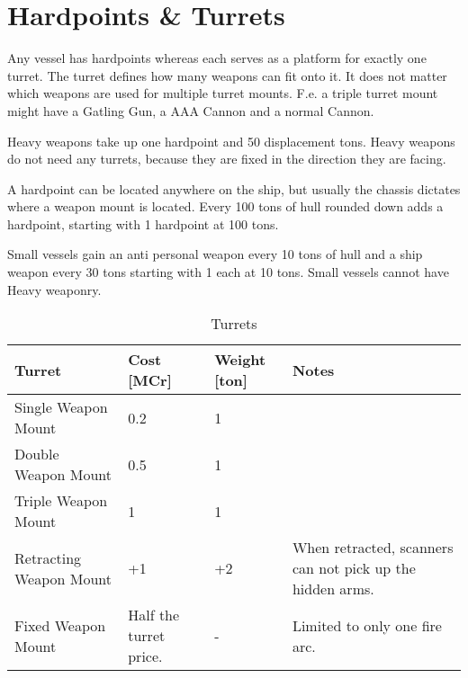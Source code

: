 \section{Hardpoints \& Turrets}
\label{sec:Hardpoints & Turrets}

Any vessel has hardpoints whereas each serves as a platform for exactly one turret. The turret defines how many weapons can fit onto it. It does not matter which weapons are used for multiple turret mounts. F.e. a triple turret mount might have a Gatling Gun, a AAA Cannon and a normal Cannon.

Heavy weapons take up one hardpoint and 50 displacement tons. Heavy weapons do not need any turrets, because they are fixed in the direction they are facing.

A hardpoint can be located anywhere on the ship, but usually the chassis dictates where a weapon mount is located. Every 100 tons of hull rounded down adds a hardpoint, starting with 1 hardpoint at 100 tons.

Small vessels gain an anti personal weapon every 10 tons of hull and a ship weapon every 30 tons starting with 1 each at 10 tons. Small vessels cannot have Heavy weaponry.

\begin{table}[H]
  \centering
  \caption{Turrets}
  \begin{tabularx}{\textwidth}{|l|X|p{1.2cm}|X|}
    \hline
    Turret                  & Cost [MCr]             & Weight [ton] & Notes                                                     \\ \hline
    Single Weapon Mount     & 0.2                    & 1             & ~                                                         \\ \hline
    Double Weapon Mount     & 0.5                    & 1             & ~                                                         \\ \hline
    Triple Weapon Mount     & 1                      & 1             & ~                                                         \\ \hline
    Retracting Weapon Mount & +1                     & +2            & When retracted, scanners can not pick up the hidden arms. \\ \hline
    Fixed Weapon Mount      & Half the turret price. & -             & Limited to only one fire arc.                             \\ \hline
  \end{tabularx}
\end{table}


